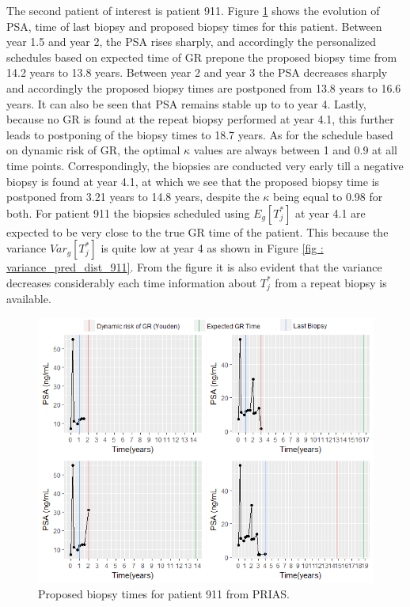 The second patient of interest is patient 911. Figure \ref{fig : prias_demo_pid_911} shows the evolution of PSA, time of last biopsy and proposed biopsy times for this patient. Between year 1.5 and year 2, the PSA rises sharply, and accordingly the personalized schedules based on expected time of GR prepone the proposed biopsy time from 14.2 years to 13.8 years. Between year 2 and year 3 the PSA decreases sharply and accordingly the proposed biopsy times are postponed from 13.8 years to 16.6 years. It can also be seen that PSA remains stable up to to year 4. Lastly, because no GR is found at the repeat biopsy performed at year 4.1, this further leads to postponing of the biopsy times to 18.7 years. As for the schedule based on dynamic risk of GR, the optimal $\kappa$ values are always between 1 and 0.9 at all time points. Correspondingly, the biopsies are conducted very early till a negative biopsy is found at year 4.1, at which we see that the proposed biopsy time is postponed from 3.21 years to 14.8 years, despite the $\kappa$ being equal to 0.98 for both. For patient 911 the biopsies scheduled using $E_g[T^*_j]$ at year 4.1 are expected to be very close to the true GR time of the patient. This because the variance $Var_g[T^*_j]$ is quite low at year 4 as shown in Figure \ref{fig : variance_pred_dist_911}. From the figure it is also evident that the variance decreases considerably each time information about $T^*_j$ from a repeat biopsy is available.\\

\begin{figure}[!htb]
\centering
\captionsetup{justification=centering}
\includegraphics[width=\textwidth]{images/prias_demo/case_911.png}
\caption{\label{fig : prias_demo_pid_911} Proposed biopsy times for patient 911 from PRIAS.}
\end{figure}

